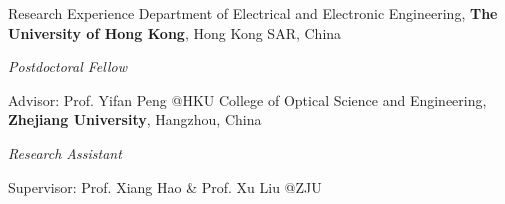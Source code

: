 \begin{rubric}{Research Experience}
	\entry*[2024/04 -- Present]%
	Department of Electrical and Electronic Engineering, \textbf{The University of Hong Kong}, Hong Kong SAR, China
	\par \textit{Postdoctoral Fellow}
	\par Advisor: Prof. Yifan Peng @HKU
    \entry*[2024/01 -- 2024/03]%
	College of Optical Science and Engineering, \textbf{Zhejiang University}, Hangzhou, China
	\par \textit{Research Assistant}
	\par Supervisor: Prof. Xiang Hao \& Prof. Xu Liu @ZJU
\end{rubric}
